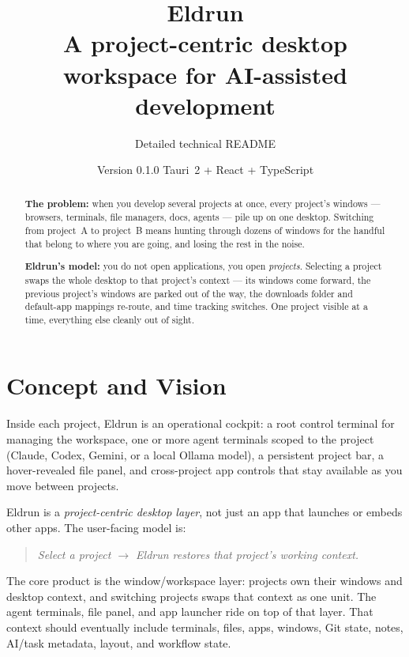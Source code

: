 \documentclass[11pt,a4paper]{article}
\title{\vspace{-1.2cm}\textbf{\color{eldrunblue}Eldrun}\\[0.3em]
\large A project-centric desktop workspace for AI-assisted development}
\author{Detailed technical README}
\date{Version 0.1.0 \quad\textbullet\quad Tauri~2 + React + TypeScript}
\begin{document}
\maketitle
\thispagestyle{fancy}

\begin{abstract}
\noindent
\textbf{The problem:} when you develop several projects at once, every project's
windows --- browsers, terminals, file managers, docs, agents --- pile up on one
desktop. Switching from project~A to project~B means hunting through dozens of
windows for the handful that belong to where you are going, and losing the rest
in the noise.

\smallskip
\noindent
\textbf{Eldrun's model:} you do not open applications, you open \emph{projects}.
Selecting a project swaps the whole desktop to that project's context --- its
windows come forward, the previous project's windows are parked out of the way,
the downloads folder and default-app mappings re-route, and time tracking
switches. One project visible at a time, everything else cleanly out of sight.
\end{abstract}

\tableofcontents
\vspace{0.6cm}

\section{Concept and Vision}

Inside each project, Eldrun is an operational cockpit: a root control terminal
for managing the workspace, one or more agent terminals scoped to the project
(Claude, Codex, Gemini, or a local Ollama model), a persistent project bar, a
hover-revealed file panel, and cross-project app controls that stay available as
you move between projects.

Eldrun is a \emph{project-centric desktop layer}, not just an app that launches
or embeds other apps. The user-facing model is:

\begin{quote}
\itshape Select a project $\rightarrow$ Eldrun restores that project's working
context.
\end{quote}

The core product is the window/workspace layer: projects own their windows and
desktop context, and switching projects swaps that context as one unit. The
agent terminals, file panel, and app launcher ride on top of that layer. That
context should eventually include terminals, files, apps, windows, Git state,
notes, AI/task metadata, layout, and workflow state.
\end{document}
